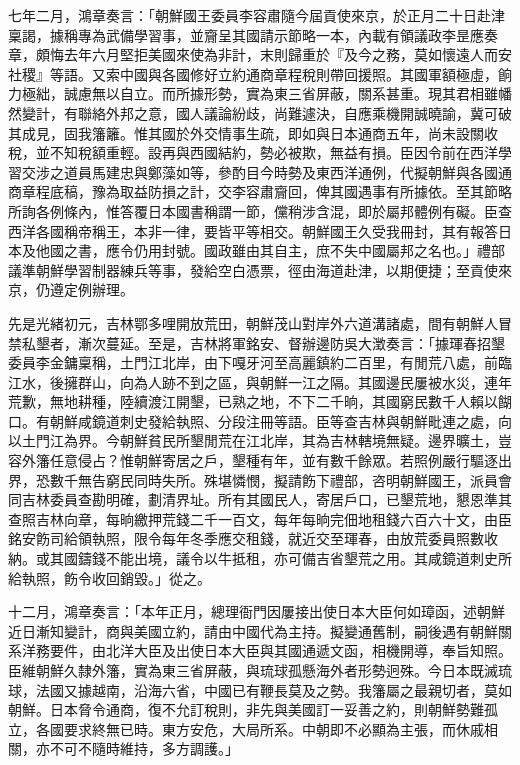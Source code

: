 \begin{pinyinscope}
七年二月，鴻章奏言：「朝鮮國王委員李容肅隨今屆貢使來京，於正月二十日赴津稟謁，據稱專為武備學習事，並齎呈其國請示節略一本，內載有領議政李昰應奏章，頗悔去年六月堅拒美國來使為非計，末則歸重於『及今之務，莫如懷遠人而安社稷』等語。又索中國與各國修好立約通商章程稅則帶回援照。其國軍額極虛，餉力極絀，誠慮無以自立。而所據形勢，實為東三省屏蔽，關系甚重。現其君相雖幡然變計，有聯絡外邦之意，國人議論紛歧，尚難遽決，自應乘機開誠曉諭，冀可破其成見，固我籓籬。惟其國於外交情事生疏，即如與日本通商五年，尚未設關收稅，並不知稅額重輕。設再與西國結約，勢必被欺，無益有損。臣因令前在西洋學習交涉之道員馬建忠與鄭藻如等，參酌目今時勢及東西洋通例，代擬朝鮮與各國通商章程底稿，豫為取益防損之計，交李容肅齎回，俾其國遇事有所據依。至其節略所詢各例條內，惟答覆日本國書稱謂一節，儻稍涉含混，即於屬邦體例有礙。臣查西洋各國稱帝稱王，本非一律，要皆平等相交。朝鮮國王久受我冊封，其有報答日本及他國之書，應令仍用封號。國政雖由其自主，庶不失中國屬邦之名也。」禮部議準朝鮮學習制器練兵等事，發給空白憑票，徑由海道赴津，以期便捷；至貢使來京，仍遵定例辦理。

先是光緒初元，吉林鄂多哩開放荒田，朝鮮茂山對岸外六道溝諸處，間有朝鮮人冒禁私墾者，漸次蔓延。至是，吉林將軍銘安、督辦邊防吳大澂奏言：「據琿春招墾委員李金鏞稟稱，土門江北岸，由下嘎牙河至高麗鎮約二百里，有閒荒八處，前臨江水，後擁群山，向為人跡不到之區，與朝鮮一江之隔。其國邊民屢被水災，連年荒歉，無地耕種，陸續渡江開墾，已熟之地，不下二千晌，其國窮民數千人賴以餬口。有朝鮮咸鏡道刺史發給執照、分段注冊等語。臣等查吉林與朝鮮毗連之處，向以土門江為界。今朝鮮貧民所墾閒荒在江北岸，其為吉林轄境無疑。邊界曠土，豈容外籓任意侵占？惟朝鮮寄居之戶，墾種有年，並有數千餘眾。若照例嚴行驅逐出界，恐數千無告窮民同時失所。殊堪憐憫，擬請飭下禮部，咨明朝鮮國王，派員會同吉林委員查勘明確，劃清界址。所有其國民人，寄居戶口，已墾荒地，懇恩準其查照吉林向章，每晌繳押荒錢二千一百文，每年每晌完佃地租錢六百六十文，由臣銘安飭司給領執照，限令每年冬季應交租錢，就近交至琿春，由放荒委員照數收納。或其國鑄錢不能出境，議令以牛抵租，亦可備吉省墾荒之用。其咸鏡道刺史所給執照，飭令收回銷毀。」從之。

十二月，鴻章奏言：「本年正月，總理衙門因屢接出使日本大臣何如璋函，述朝鮮近日漸知變計，商與美國立約，請由中國代為主持。擬變通舊制，嗣後遇有朝鮮關系洋務要件，由北洋大臣及出使日本大臣與其國通遞文函，相機開導，奉旨知照。臣維朝鮮久隸外籓，實為東三省屏蔽，與琉球孤懸海外者形勢迥殊。今日本既滅琉球，法國又據越南，沿海六省，中國已有鞭長莫及之勢。我籓屬之最親切者，莫如朝鮮。日本脅令通商，復不允訂稅則，非先與美國訂一妥善之約，則朝鮮勢難孤立，各國要求終無已時。東方安危，大局所系。中朝即不必顯為主張，而休戚相關，亦不可不隨時維持，多方調護。」


\end{pinyinscope}
